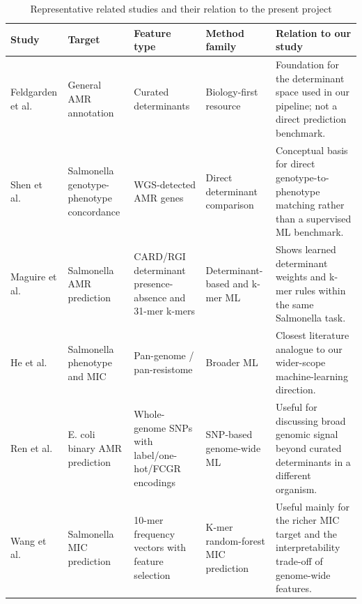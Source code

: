 \begin{table}[H]
\centering
\caption{Representative related studies and their relation to the present project}
\label{tab:related-work-overview}
\scriptsize
\setlength{\tabcolsep}{3pt}
\renewcommand{\arraystretch}{1.1}
\begin{tabular}{@{}p{2.1cm} p{1.8cm} p{2.1cm} p{2.0cm} p{4.8cm}@{}}
\toprule
Study & Target & Feature type & Method family & Relation to our study \\
\midrule
Feldgarden et al.~\citep{feldgarden2021amrfinderplus} & General AMR annotation & Curated determinants & Biology-first resource & Foundation for the determinant space used in our pipeline; not a direct prediction benchmark. \\
Shen et al.~\citep{shen2024comparison} & Salmonella genotype-phenotype concordance & WGS-detected AMR genes & Direct determinant comparison & Conceptual basis for direct genotype-to-phenotype matching rather than a supervised ML benchmark. \\
Maguire et al.~\citep{maguire2019identification} & Salmonella AMR prediction & CARD/RGI determinant presence-absence and 31-mer k-mers & Determinant-based and k-mer ML & Shows learned determinant weights and k-mer rules within the same Salmonella task. \\
He et al.~\citep{he2025prediction} & Salmonella phenotype and MIC & Pan-genome / pan-resistome & Broader ML & Closest literature analogue to our wider-scope machine-learning direction. \\
Ren et al.~\citep{ren2022prediction} & E. coli binary AMR prediction & Whole-genome SNPs with label/one-hot/FCGR encodings & SNP-based genome-wide ML & Useful for discussing broad genomic signal beyond curated determinants in a different organism. \\
Wang et al.~\citep{wang2023using} & Salmonella MIC prediction & 10-mer frequency vectors with feature selection & K-mer random-forest MIC prediction & Useful mainly for the richer MIC target and the interpretability trade-off of genome-wide features. \\
\bottomrule
\end{tabular}
\end{table}
